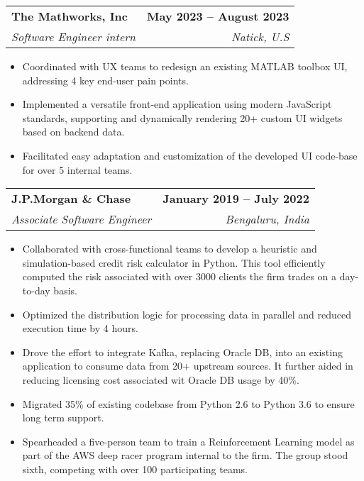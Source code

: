 \documentclass[letterpaper,11pt]{article}
\makeatletter
\newcommand{\resumeItem}[1]{
  \item\small{
    {#1 \vspace{-2pt}}
  }
}
\newcommand{\resumeSubheading}[4]{
  \vspace{-2pt}\item
    \begin{tabular*}{1.0\textwidth}[t]{l@{\extracolsep{\fill}}r}
      \textbf{#1} & \textbf{\small #2} \\
      \textit{\small#3} & \textit{\small #4} \\
    \end{tabular*}\vspace{-7pt}
}
\newcommand{\resumeItemListStart}{\begin{itemize}}
\newcommand{\resumeItemListEnd}{\end{itemize}\vspace{-5pt}}
\makeatother
\begin{document}
    \resumeSubheading
      {The Mathworks, Inc}{May 2023 -- August 2023}
      {Software Engineer intern}{Natick, U.S}
      \resumeItemListStart
        \resumeItem{Coordinated with UX teams to redesign an existing MATLAB toolbox UI, addressing 4 key end-user pain points.}
        \resumeItem{Implemented a versatile front-end application using modern JavaScript standards, supporting and dynamically rendering 20+ custom UI widgets based on backend data. }
        \resumeItem{Facilitated easy adaptation and customization of the developed UI code-base for over 5 internal teams.}
      \resumeItemListEnd

    \resumeSubheading
      {J.P.Morgan \& Chase}{January 2019 -- July 2022}
      {Associate Software Engineer}{Bengaluru, India}
      \resumeItemListStart
        \resumeItem{Collaborated with cross-functional teams to develop a heuristic and simulation-based credit risk calculator in Python. This tool efficiently computed the risk associated with over 3000 clients the firm trades on a day-to-day basis. }
        \resumeItem{Optimized the distribution logic for processing data in parallel and reduced execution time by 4 hours.}
        \resumeItem{Drove the effort to integrate Kafka, replacing Oracle DB, into an existing application to consume data from 20+ upstream sources. It further aided in reducing licensing cost associated wit Oracle DB usage by 40\%.}
        \resumeItem{Migrated 35\% of existing codebase from Python 2.6 to Python 3.6 to ensure long term support.}
        \resumeItem{Spearheaded a five-person team to train a Reinforcement Learning model as part of the AWS deep racer program internal to the firm. The group stood sixth, competing with over 100 participating teams.}
      \resumeItemListEnd

    
\end{document}

